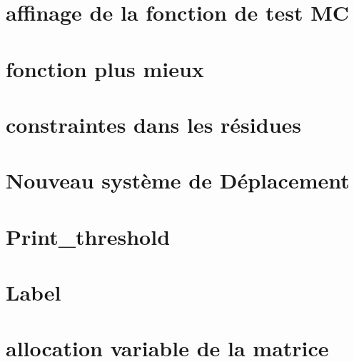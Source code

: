 \section{affinage de la fonction de test MC}
\section{fonction plus mieux}
\section{constraintes dans les résidues}
\section{Nouveau système de Déplacement}
\section{Print\_threshold}
\section{Label}
\section{allocation variable de la matrice}

\clearpage


